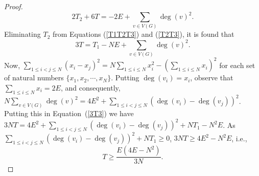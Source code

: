 \documentclass[10pt,a4paper]{amsart}
\begin{document}
\begin{proof}
 \begin{equation}
 2	T_2 +6 T  =-2 E +\sum_{v \in V(G)} \deg(v)^2.
	\label{T2T3}
\end{equation}
Eliminating $T_2$ from Equations (\ref{T1T2T3})  and (\ref{T2T3}), it is found that \begin{equation}
	3T =T_1 -NE +\sum_{v \in V(G)} \deg(v)^2.
	\label{3T3}
	\end{equation} 
Now, $\sum_{1 \leq i <j\leq N} (x_i -x_j)^2 =N\sum_{1\leq i \leq N} x_i ^2 - (\sum_{1 \leq i \leq N} x_i)^2$ for each set of natural numbers $\{x_1, x_2, \cdots, x_N\}$. Putting $\deg(v_i)=x_i$, observe that $\sum_{1 \leq i \leq N} x_i = 2E$, and consequently,  $N \sum_{v \in V(G)} \deg(v)^2 =4E^2+\sum_{1 \leq i < j\leq N} (\deg(v_i) -\deg(v_j))^2$. Putting this in Equation~(\ref{3T3}) we have $3 N T  = 4E^2 + \sum_{1 \leq i <j \leq N} (\deg(v_i) -\deg(v_j))^2 +NT_1 -N^2 E$. As $ \sum_{1 \leq i <j \leq N} (\deg(v_i) -\deg(v_j))^2 +NT_1 \geq 0$, $3 NT  \geq 4E^2 -N^2 E$, i.e., $$ T   \geq \frac{E(4E -N^2)}{3N}.$$ 
  \end{proof}
\end{document}
